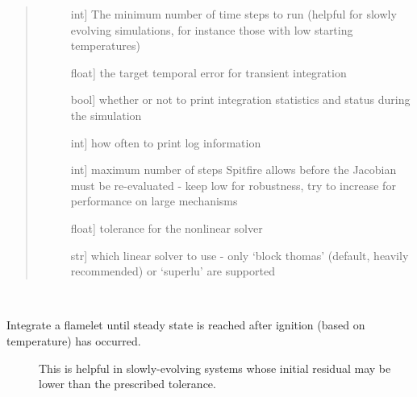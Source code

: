 \documentclass[letterpaper,10pt,english]{sphinxmanual}
\begin{document}
\begin{fulllineitems}
\begin{fulllineitems}
\begin{quote}
\begin{description}
\begin{description}
\item[{}] \leavevmode{[}int{]}
The minimum number of time steps to run (helpful for slowly evolving simulations, for instance those with low starting temperatures)

\item[{}] \leavevmode{[}float{]}
the target temporal error for transient integration

\item[{}] \leavevmode{[}bool{]}
whether or not to print integration statistics and status during the simulation

\item[{}] \leavevmode{[}int{]}
how often to print log information

\item[{}] \leavevmode{[}int{]}
maximum number of steps Spitfire allows before the Jacobian must be re-evaluated - keep low for robustness, try to increase for performance on large mechanisms

\item[{}] \leavevmode{[}float{]}
tolerance for the nonlinear solver

\item[{}] \leavevmode{[}str{]}
which linear solver to use - only ‘block thomas’ (default, heavily recommended) or ‘superlu’ are supported

\end{description}

\end{description}\end{quote}

\end{fulllineitems}


\begin{fulllineitems}
\label{\detokenize{spitfire.chemistry.flamelet:spitfire.chemistry.flamelet.Flamelet.integrate_to_steady_after_ignition}}~\begin{description}
\item[{Integrate a flamelet until steady state is reached after ignition (based on temperature) has occurred.}] \leavevmode
This is helpful in slowly-evolving systems whose initial residual may be lower than the prescribed tolerance.


\end{description}
\end{fulllineitems}
\end{fulllineitems}
\end{document}
